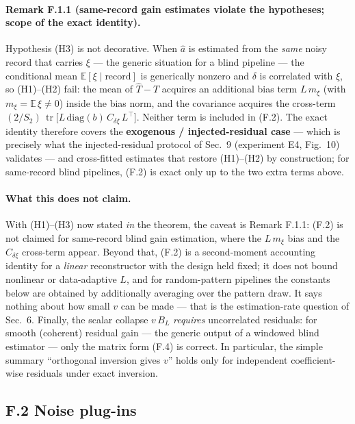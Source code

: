 \paragraph{Remark F.1.1 (same-record gain estimates violate the hypotheses; scope of the exact identity).} Hypothesis (H3) is not decorative. When $\hat a$ is estimated from the \emph{same} noisy record that carries $\xi$ --- the generic situation for a blind pipeline --- the conditional mean $\mathbb{E}[\xi\mid\text{record}]$ is generically nonzero and $\delta$ is correlated with $\xi$, so (H1)--(H2) fail: the mean of $\hat T-T$ acquires an additional bias term $L\,m_\xi$ (with $m_\xi=\mathbb{E}\,\xi\neq0$) inside the bias norm, and the covariance acquires the cross-term $(2/S_2)\,\operatorname{tr}\!\big[L\,\mathrm{diag}(b)\,C_{\delta\xi}\,L^\top\big]$. Neither term is included in (F.2). The exact identity therefore covers the \textbf{exogenous / injected-residual case} --- which is precisely what the injected-residual protocol of Sec.~9 (experiment E4, Fig.~10) validates --- and cross-fitted estimates that restore (H1)--(H2) by construction; for same-record blind pipelines, (F.2) is exact only up to the two extra terms above.

\paragraph{What this does not claim.} With (H1)--(H3) now stated \emph{in} the theorem, the caveat is Remark F.1.1: (F.2) is not claimed for same-record blind gain estimation, where the $L\,m_\xi$ bias and the $C_{\delta\xi}$ cross-term appear. Beyond that, (F.2) is a second-moment accounting identity for a \emph{linear} reconstructor with the design held fixed; it does not bound nonlinear or data-adaptive $L$, and for random-pattern pipelines the constants below are obtained by additionally averaging over the pattern draw. It says nothing about how small $v$ can be made --- that is the estimation-rate question of Sec.~6. Finally, the scalar collapse $v\,B_L$ \emph{requires} uncorrelated residuals: for smooth (coherent) residual gain --- the generic output of a windowed blind estimator --- only the matrix form (F.4) is correct. In particular, the simple summary ``orthogonal inversion gives $v$'' holds only for independent coefficient-wise residuals under exact inversion.

\subsection{F.2 Noise plug-ins}

